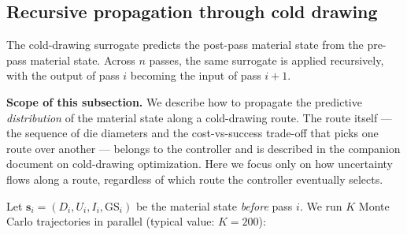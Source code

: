 \documentclass[11pt,a4paper]{article}
\begin{document}
\subsection{Recursive propagation through cold drawing}
\label{sec:propagation-cd}

The cold-drawing surrogate predicts the post-pass material state from the pre-pass material state. Across $n$ passes, the same surrogate is applied recursively, with the output of pass $i$ becoming the input of pass $i+1$.

\begin{recapbox}
\textbf{Scope of this subsection.} We describe how to propagate the predictive \emph{distribution} of the material state along a cold-drawing route. The route itself --- the sequence of die diameters and the cost-vs-success trade-off that picks one route over another --- belongs to the controller and is described in the companion document on cold-drawing optimization. Here we focus only on how uncertainty flows along a route, regardless of which route the controller eventually selects.
\end{recapbox}

Let $\bm s_i = (D_i, U_i, I_i, \mathrm{GS}_i)$ be the material state \emph{before} pass $i$. We run $K$ Monte Carlo trajectories in parallel (typical value: $K = 200$):
\end{document}
